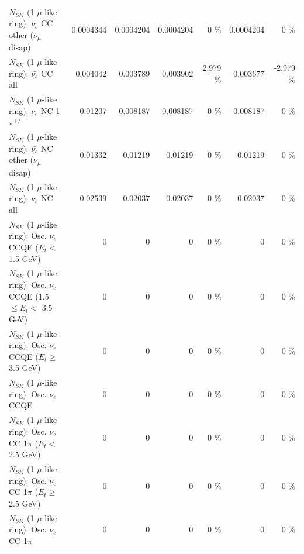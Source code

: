\begin{table}
\begin{tabular}{| l | r | r | r  r | r  r |}
          $N_{SK}$ (1 $\mu$-like ring): $\bar{\nu_e}$ CC other ($\nu_\mu$ disap) &       0.0004344 &       0.0004204 &       0.0004204 &        0 \%  &       0.0004204 &        0 \%  \\ 
                            $N_{SK}$ (1 $\mu$-like ring): $\bar{\nu_{e}}$ CC all &        0.004042 &        0.003789 &        0.003902 &    2.979 \%  &        0.003677 &   -2.979 \%  \\ 
\hline
                     $N_{SK}$ (1 $\mu$-like ring): $\bar{\nu_e}$ NC 1$\pi^{+/-}$ &         0.01207 &        0.008187 &        0.008187 &        0 \%  &        0.008187 &        0 \%  \\ 
          $N_{SK}$ (1 $\mu$-like ring): $\bar{\nu_e}$ NC other ($\nu_\mu$ disap) &         0.01332 &         0.01219 &         0.01219 &        0 \%  &         0.01219 &        0 \%  \\ 
                            $N_{SK}$ (1 $\mu$-like ring): $\bar{\nu_{e}}$ NC all &         0.02539 &         0.02037 &         0.02037 &        0 \%  &         0.02037 &        0 \%  \\ 
\hline
\hline
\hline
             $N_{SK}$ (1 $\mu$-like ring): Osc. $\nu_e$ CCQE ($E_{t} <$ 1.5 GeV) &               0 &               0 &               0 &        0 \%  &               0 &        0 \%  \\ 
    $N_{SK}$ (1 $\mu$-like ring): Osc. $\nu_e$ CCQE (1.5 $\leq E_{t} <$ 3.5 GeV) &               0 &               0 &               0 &        0 \%  &               0 &        0 \%  \\ 
          $N_{SK}$ (1 $\mu$-like ring): Osc. $\nu_e$ CCQE ($E_{t} \geq$ 3.5 GeV) &               0 &               0 &               0 &        0 \%  &               0 &        0 \%  \\ 
\hline
                                 $N_{SK}$ (1 $\mu$-like ring): Osc. $\nu_e$ CCQE &               0 &               0 &               0 &        0 \%  &               0 &        0 \%  \\ 
\hline
        $N_{SK}$ (1 $\mu$-like ring): Osc. $\nu_e$ CC 1$\pi$ ($E_{t} <$ 2.5 GeV) &               0 &               0 &               0 &        0 \%  &               0 &        0 \%  \\ 
     $N_{SK}$ (1 $\mu$-like ring): Osc. $\nu_e$ CC 1$\pi$ ($E_{t} \geq$ 2.5 GeV) &               0 &               0 &               0 &        0 \%  &               0 &        0 \%  \\ 
\hline
                            $N_{SK}$ (1 $\mu$-like ring): Osc. $\nu_e$ CC 1$\pi$ &               0 &               0 &               0 &        0 \%  &               0 &        0 \%  \\ 

\end{tabular}
\end{table}
